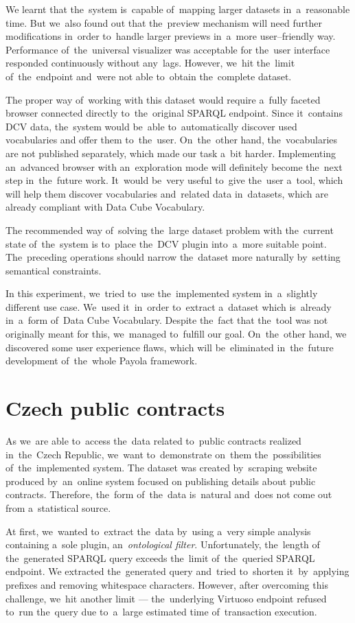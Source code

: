 We learnt that the~system is~capable of~mapping larger datasets in~a~reasonable 
time. But we~also found out that the~preview mechanism will need further 
modifications in~order to~handle larger previews in~a~more user--friendly way. 
Performance of~the~universal visualizer was acceptable for the~user interface 
responded continuously without any~lags.
However, we~hit the~limit of~the~endpoint and~were not able to~obtain the~complete dataset. 

The proper way of~working with this dataset would require a~fully faceted 
browser connected directly to~the~original SPARQL endpoint. Since it~contains 
DCV data, the~system would be~able to~automatically discover used vocabularies 
and offer them to~the~user. On~the~other hand, the~vocabularies are not published
separately, which made our task a~bit harder. Implementing an~advanced browser
with an~exploration mode will definitely become the~next step in~the~future work. It~would be~very useful to~give the~user a~tool, which will help them 
discover vocabularies and~related data in~datasets, which are already compliant 
with Data Cube Vocabulary.

The recommended way of~solving the~large dataset problem with the~current state of~the~system
is to~place the~DCV 
plugin into~a~more suitable point. The~preceding operations should narrow the~dataset more naturally by~setting semantical constraints.

In this experiment, we~tried to~use the~implemented system in~a~slightly 
different use case. We~used it~in~order to~extract a~dataset which is~already in~a~form of~Data Cube Vocabulary. Despite the~fact that the~tool was not 
originally meant for this, we~managed to~fulfill our goal. On~the~other hand, 
we discovered some user experience flaws, which will be~eliminated in~the~future 
development of~the~whole Payola framework.

\section{Czech public contracts}
As we~are able to~access the~data related to~public contracts realized in~the~Czech Republic, we~want to~demonstrate on~them the~possibilities of~the~implemented system.
The dataset was created by~scraping website produced by~an~online system focused 
on publishing details about public contracts. Therefore, the~form of~the~data is~natural
and~does not come out from a~statistical source.

At first, we~wanted to~extract the~data by~using a~very simple analysis
containing a~sole plugin, an~\emph{ontological filter}. Unfortunately, the~length
of the~generated SPARQL query exceeds the~limit of~the~queried SPARQL endpoint.
We extracted the~generated query and~tried to~shorten it~by~applying prefixes 
and removing whitespace characters. However, after overcoming this challenge, we~hit another limit --- the~underlying Virtuoso endpoint refused to~run the~query 
due to~a~large estimated time of~transaction execution.

